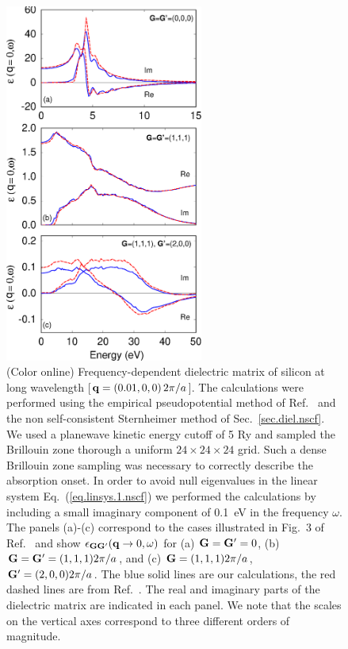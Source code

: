 \documentclass[twocolumn,prb,showpacs,superscriptaddress]{revtex4}
\def\w{\omega}
\def\q{{\bf q}}
\def\G{{\bf G}}
\def\Gp{{\bf G^\prime}}
\begin{document}
\begin  {figure}
\begin  {center}
\includegraphics[width=6.5cm]{fig2.eps}
\end    {center}
\caption{\label{fig2}
        (Color online)
        Frequency-dependent dielectric matrix of silicon at long wavelength [$\q=(0.01,0,0) \, 2\pi/a$].
        The calculations were performed using the empirical pseudopotential method of Ref.\  
        and the non self-consistent Sternheimer method of Sec.\ \ref{sec.diel.nscf}.
        We used a planewave kinetic energy cutoff of 5 Ry and sampled the Brillouin zone thorough a uniform 
        $24\times 24\times 24$ grid. Such a dense Brillouin zone sampling was necessary to correctly describe
        the absorption onset. In order to avoid null eigenvalues in the linear system Eq.\ (\ref{eq.linsys.1.nscf})
        we performed the calculations by including a small imaginary component of 0.1~eV in the frequency $\w$.
        The panels (a)-(c) correspond to the cases illustrated in Fig.\ 3 of Ref.\ 
        and show $\epsilon_{\G\Gp}(\q\rightarrow 0,\w)$ for (a) $\G=\Gp=0$, (b) $\G=\Gp=(1,1,1) 2\pi/a$,
        and (c) $\G=(1,1,1) 2\pi/a$, $\Gp=(2,0,0) 2\pi/a$.
        The blue solid lines are our calculations, the red dashed lines are from Ref.\ .
        The real and imaginary parts of the dielectric matrix are indicated in each panel.
        We note that the scales on the vertical axes correspond to three different orders of magnitude.
        }
\end    {figure}
\end{document}
